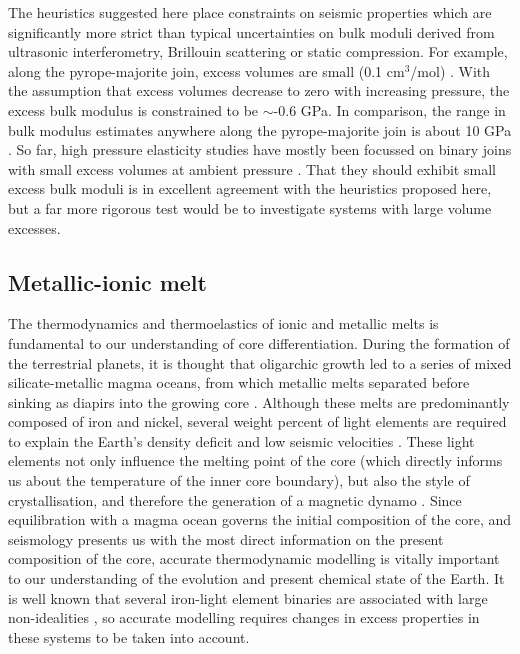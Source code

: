 The heuristics suggested here place constraints on seismic properties which are significantly more strict than typical uncertainties on bulk moduli derived from ultrasonic interferometry, Brillouin scattering or static compression. For example, along the pyrope-majorite join, excess volumes are small (0.1 cm$^3$/mol) \citep{HSSR1997}. With the assumption that excess volumes decrease to zero with increasing pressure, the excess bulk modulus is constrained to be $\sim$-0.6 GPa. In comparison, the range in bulk modulus estimates anywhere along the pyrope-majorite join is about 10 GPa \citep[see, for example][]{HDLWB2010}. So far, high pressure elasticity studies have mostly been focussed on binary joins with small excess volumes at ambient pressure \citep{FXMLX2015, HC2014}. That they should exhibit small excess bulk moduli is in excellent agreement with the heuristics proposed here, but a far more rigorous test would be to investigate systems with large volume excesses.

\subsection{Metallic-ionic melt}
The thermodynamics and thermoelastics of ionic and metallic melts is fundamental to our understanding of core differentiation. During the formation of the terrestrial planets, it is thought that oligarchic growth led to a series of mixed silicate-metallic magma oceans, from which metallic melts separated before sinking as diapirs into the growing core \citep{Rubieetal2015}. Although these melts are predominantly composed of iron and nickel, several weight percent of light elements are required to explain the Earth's density deficit and low seismic velocities \citep{Poirier1994}. These light elements not only influence the melting point of the core (which directly informs us about the temperature of the inner core boundary), but also the style of crystallisation, and therefore the generation of a magnetic dynamo \citep{SSWL2007}. Since equilibration with a magma ocean governs the initial composition of the core, and seismology presents us with the most direct information on the present composition of the core, accurate thermodynamic modelling is vitally important to our understanding of the evolution and present chemical state of the Earth. It is well known that several iron-light element binaries are associated with large non-idealities \citep[e.g.][]{Frostetal2010}, so accurate modelling requires changes in excess properties in these systems to be taken into account.

